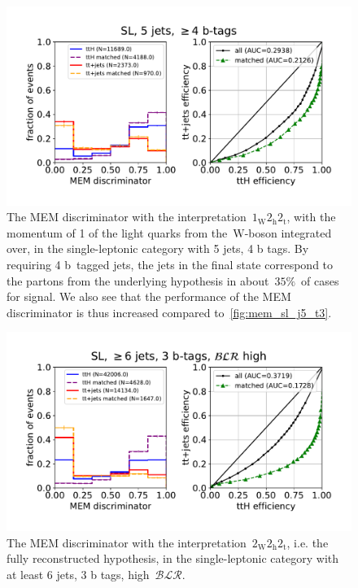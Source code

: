 \begin{figure}
\begin{centering}
\includegraphics[width = 1.0\textwidth]{figures/mem_sl_j5_tge4.pdf}
\caption{The MEM discriminator with the interpretation~$1_{\mathrm{W}} 2_{\mathrm{h}} 2_{\mathrm{t}}$, with the momentum of 1 of the light quarks from the~$\mathrm{W}$-boson integrated over, in the single-leptonic category with 5 jets, 4 b tags. By requiring 4 b~tagged jets, the jets in the final state correspond to the partons from the underlying hypothesis in about~$35\%$~of cases for signal. We also see that the performance of the MEM discriminator is thus increased compared to~\cref{fig:mem_sl_j5_t3}.}
\label{fig:mem_sl_j5_t4}
\end{centering}
\end{figure}

\begin{figure}
\begin{centering}
\includegraphics[width = 1.0\textwidth]{figures/mem_sl_jge6_t3_blrH.pdf}
\caption{The MEM discriminator with the interpretation~$2_{\mathrm{W}} 2_{\mathrm{h}} 2_{\mathrm{t}}$, i.e. the fully reconstructed hypothesis, in the single-leptonic category with at least 6 jets, 3 b tags, high~$\mathcal{BLR}$.}
\label{fig:mem_sl_jge6_t3}
\end{centering}
\end{figure}

